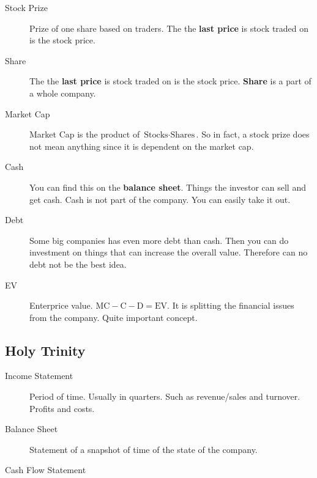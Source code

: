 \documentclass{article}
\theoremstyle{remark}
\begin{document}
\begin{description}
  \item[Stock Prize] Prize of one share based on traders. The the \textbf{last price} is stock traded on is the stock price.

  \item[Share] The the \textbf{last price} is stock traded on is the stock price. \textbf{Share} is a part of a whole company.

  \item[Market Cap]
    Market Cap is the product of $\text{Stocks} \cdot  \text{Shares}$. So in fact, a stock prize does not mean anything since it is dependent on the market cap. 

  \item[Cash] You can find this on the \textbf{balance sheet}.  Things the investor can sell and get cash. Cash is not part of the company. You can easily take it out.

  \item[Debt] Some big companies has even more debt than cash. Then you can do investment on things that can increase the overall value. Therefore can no debt not be the best idea. 
  \item[EV] Enterprice value. $\text{MC} - \text{C} - \text{D} = \text{EV}$.  It is splitting the financial issues from the company. Quite important concept. 
\end{description}


\subsection{Holy Trinity}%
\label{sub:holy_triangle}

\begin{description}
  \item[Income Statement] 
    Period of time. Usually in quarters. Such as revenue/sales and turnover. Profits and costs.  
  \item[Balance Sheet] 
    Statement of a snapshot of time of the state of the company. 
  \item[Cash Flow Statement] 
\end{description}











\end{document}
